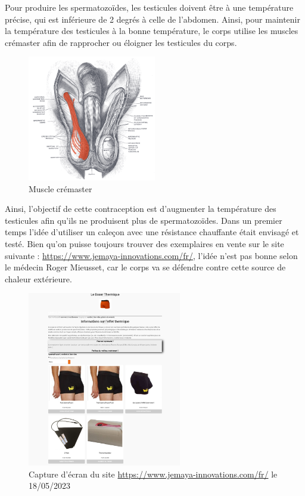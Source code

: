 \documentclass[12pt,a4paper]{report}
\begin{document}
Pour produire les spermatozoïdes, les testicules doivent être à une température précise, qui est inférieure de 2 degrés à celle de l'abdomen. \cite{Testicule2023}
Ainsi, pour maintenir la température des testicules à la bonne température, le corps utilise les muscles crémaster afin de rapprocher ou éloigner les testicules du corps. \cite{MuscleCremasterWikipedia}

\begin{figure}[h]
    \centering
    \includegraphics[width=0.5\textwidth]{images/scientiphique/Musculus_cremaster.png}
    \caption{Muscle crémaster}
    \label{fig:muscles-cremaster}
\end{figure}

Ainsi, l'objectif de cette contraception est d'augmenter la température des testicules afin qu'ils ne produisent plus de spermatozoïdes. \cite{wallachRoleTemperatureRegulation1988}
Dans un premier temps l'idée d'utiliser un caleçon avec une résistance chauffante était envisagé et testé. Bien qu'on puisse toujours trouver des exemplaires en vente sur le site suivante : \href{https://www.jemaya-innovations.com/fr/}{https://www.jemaya-innovations.com/fr/}, l'idée n'est pas bonne selon le médecin Roger Mieusset, car le corps va se défendre contre cette source de chaleur extérieure. \cite{guillaumedaudinContraceptesEnqueteDernier2022}

\begin{figure}[h]
    \centering
    \includegraphics[width=0.6\textwidth]{images/scientiphique/www.jemaya-innovations.com.jpeg}
    \caption{Capture d'écran du site \href{https://www.jemaya-innovations.com/fr/}{https://www.jemaya-innovations.com/fr/} le 18/05/2023}
    \label{fig:site-jemaya}
\end{figure}
\end{document}

